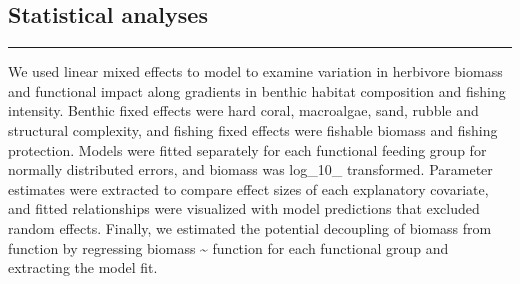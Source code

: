 \documentclass[]{article}
\begin{document}
\hypertarget{statistical-analyses}{%
\subsection{Statistical analyses}\label{statistical-analyses}}

\begin{center}\rule{0.5\linewidth}{\linethickness}\end{center}

We used linear mixed effects to model to examine variation in herbivore
biomass and functional impact along gradients in benthic habitat
composition and fishing intensity. Benthic fixed effects were hard
coral, macroalgae, sand, rubble and structural complexity, and fishing
fixed effects were fishable biomass and fishing protection. Models were
fitted separately for each functional feeding group for normally
distributed errors, and biomass was log\_10\_ transformed. Parameter
estimates were extracted to compare effect sizes of each explanatory
covariate, and fitted relationships were visualized with model
predictions that excluded random effects. Finally, we estimated the
potential decoupling of biomass from function by regressing biomass
\textasciitilde{} function for each functional group and extracting the
model fit.
\end{document}
